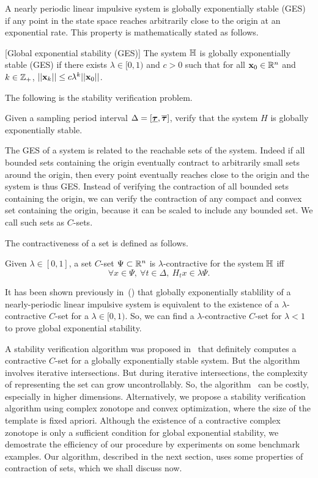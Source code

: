 A nearly periodic linear impulsive system is globally exponentially
stable (GES) if any point in the state space reaches arbitrarily close
to the origin at an exponential rate.  This property is mathematically
stated as follows.
%
\begin{defn}\label{defn:exp-stable}[Global exponential stability (GES)] The
system $\mathbb{H}$ is globally exponentially stable
(GES) if there exists $\lambda\in[0,1)$ and $c>0$ such that for all $\textbf{x}_0
\in\mathbb{R}^n$ and $k\in\mathbb{Z}_+$,
$||\textbf{x}_k||\leq c\lambda^k||\textbf{x}_0||$.
\end{defn}
%
The following is the stability verification problem.
%
\begin{problem}
Given a sampling period interval $\Delta=[\bm{\underline{\tau}},\bm{\overline{\tau}}]$, verify
that the system $H$ is globally exponentially stable.
\end{problem}
%
The GES of a system is related to the reachable sets of the
system. Indeed if all bounded sets containing the origin eventually
contract to arbitrarily small sets around the origin, then every point
eventually reaches close to the origin and the system is thus
GES. Instead of verifying the contraction of all bounded sets
containing the origin, we can verify the contraction of any compact
and convex set containing the origin, because it can be scaled to
include any bounded set. We
call such sets as $C$-sets.

The contractiveness of a set is defined as follows.
%
\begin{definition}
Given $\lambda\in[0,1]$, a set $C$-set $\Psi\subset\mathbb{R}^n$ is
$\lambda$-contractive for the system $\mathbb{H}$ iff
\[\forall x\in\Psi,~\forall t\in\Delta,~H_tx\in\lambda\Psi.\]
\end{definition}
%
\begin{remark} It has been shown previously
in~(\cite{2014-fiacchini-set,athanasopoulos2014alternative,AlKhatib2015})
that globally exponentially stablility of a nearly-periodic linear
impulsive system is equivalent to the existence of a
$\lambda$-contractive $C$-set for a $\lambda\in[0,1)$.  So, we can
  find a $\lambda$-contractive $C$-set for $\lambda<1$ to prove  global
  exponential stability.
\end{remark}
%
  A stability verification algorithm was proposed
  in~\cite{2014-fiacchini-set} that definitely computes a contractive
  $C$-set for a globally exponentially stable system.  But the
  algorithm involves iterative intersections.  But during iterative
  intersections, the complexity of representing the set can grow
  uncontrollably.  So, the
  algorithm~\cite{2014-fiacchini-set} can be costly, especially in
  higher dimensions.  Alternatively, we propose a stability
  verification algorithm using complex zonotope and convex
  optimization, where the size of the template is fixed apriori.
  Although the existence of a contractive complex zonotope is only a
  sufficient condition for global exponential stability, we demostrate
  the efficiency of our procedure by experiments on some benchmark
  examples.  Our algorithm, described in the next section, uses some
  properties of contraction of sets, which we shall discuss now.

